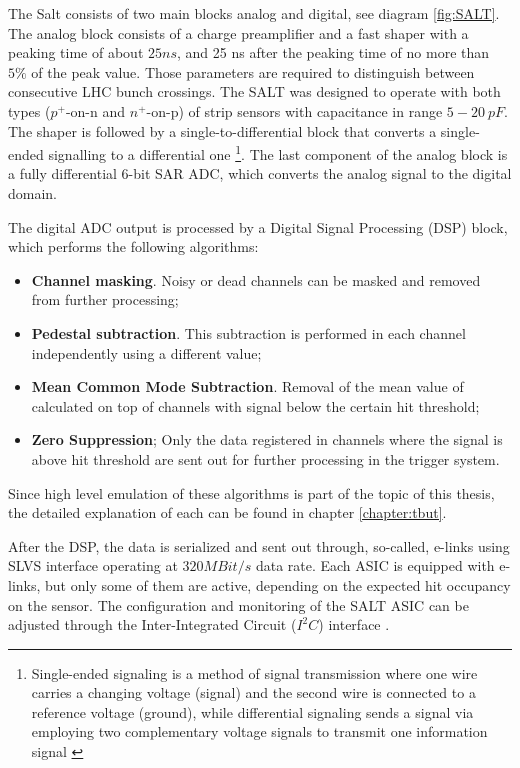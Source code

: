 The Salt consists of two main blocks analog and digital, see diagram \ref{fig:SALT}. The analog block consists of a charge preamplifier and a fast shaper with a peaking time of about $25 ns$, and 25 ns after the peaking time of no more than $5\%$ of the peak value.  Those parameters are required to distinguish between consecutive LHC bunch crossings. The SALT was designed to operate with both types ($p^{+}\text{-on-n}$ and $n^{+}\text{-on-p}$) of strip sensors with capacitance in range $5-20~ pF$. 
The shaper is followed by a single-to-differential block that converts a single-ended signalling to a differential one \footnote{Single-ended signaling is a method of signal transmission where one wire carries a changing voltage (signal) and the second wire is connected to a reference voltage (ground), while differential signaling sends a signal via employing two complementary voltage signals to transmit one information signal \cite{signals}}. The last component of the analog block is a fully differential 6-bit SAR ADC, which converts the analog signal to the digital domain. 

The digital ADC output is processed by a Digital Signal Processing (DSP) block, which performs the following algorithms: 

\begin{itemize}
    \item \textbf{Channel masking}. Noisy or dead channels can be masked and removed from further processing; 
    \item \textbf{Pedestal subtraction}. This subtraction is performed in each channel independently using a different value;
    \item \textbf{Mean Common Mode Subtraction}. Removal of the mean value of calculated on top of channels with signal below the certain hit threshold; 
    \item \textbf{Zero Suppression}; Only the data registered in channels where the signal is above hit threshold are sent out for further processing in the trigger system.
\end{itemize}

Since high level emulation of these algorithms is part of the topic of this thesis, the detailed explanation of each can be found in chapter \ref{chapter:tbut}. 

After the DSP, the data is serialized and sent out through, so-called, e-links using SLVS interface \cite{SLVS} operating at $320 MBit/s$ data rate. Each ASIC is equipped with  e-links, but only some of them are active, depending on the expected hit occupancy on the sensor.  The configuration and monitoring of the SALT ASIC can be adjusted through the Inter-Integrated
Circuit ($I^{2}C$) interface \cite{i2c}.

